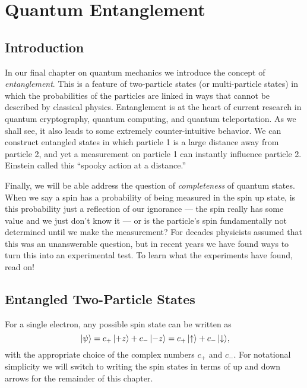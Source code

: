 
\chapter{Quantum Entanglement}
\label{chapter:quantum_entanglement}

\section{Introduction}
\label{sec:quantum_entanglement_intro}

In our final chapter on quantum mechanics we introduce the concept of
\textit{entanglement}.  This is a feature of two-particle states (or
multi-particle states) in which the probabilities of the particles are
linked in ways that cannot be described by classical physics.
Entanglement is at the heart of current research in quantum
cryptography, quantum computing, and quantum teleportation.  As we
shall see, it also leads to some extremely counter-intuitive behavior.
We can construct entangled states in which particle 1 is a large
distance away from particle 2, and yet a measurement on particle 1 can
instantly influence particle 2.  Einstein called this ``spooky action
at a distance.''

Finally, we will be able address the question of \textit{completeness}
of quantum states.  When we say a spin has a probability of being
measured in the spin up state, is this probability just a reflection
of our ignorance --- the spin really has some value and we just don't
know it --- or is the particle's spin fundamentally not determined
until we make the measurement?  For decades physicists assumed that
this was an unanswerable question, but in recent years we have found
ways to turn this into an experimental test.  To learn what the
experiments have found, read on!

\section{Entangled Two-Particle States}
\label{sec:two_particle_states}

For a single electron, any possible spin state can be written as
\begin{equation}
\,|\mbox{$\psi$}\rangle = c_+\,|\mbox{$+z$}\rangle + c_-\,|\mbox{$-z$}\rangle = c_+\,|\mbox{$\uparrow$}\rangle
 + c_-\,|\mbox{$\downarrow$}\rangle,
\label{eq:spin_half_state}
\end{equation}
with the appropriate choice of the complex numbers $c_+$ and $c_-$.
For notational simplicity we will switch to writing the spin states in
terms of up and down arrows for the remainder of this chapter.

